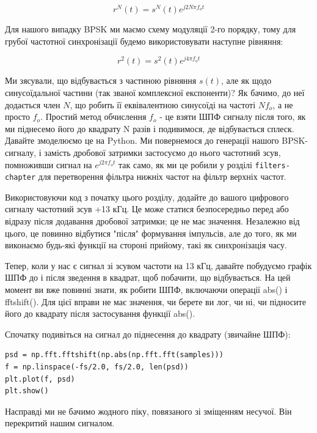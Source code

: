 \[r^N(t) = s^N(t) e^{j2N\pi f_o t}\]

Для нашого випадку BPSK ми маємо схему модуляції 2-го порядку, тому для
грубої частотної синхронізації будемо використовувати наступне рівняння:

\[r^2(t) = s^2(t) e^{j4\pi f_o t}\]

Ми з\textquotesingle ясували, що відбувається з частиною рівняння
\(s(t)\), але як щодо синусоїдальної частини (так званої комплексної
експоненти)? Як бачимо, до неї додається член \(N\), що робить її
еквівалентною синусоїді на частоті \(Nf_o\), а не просто \(f_o\).
Простий метод обчислення \(f_o\) - це взяти ШПФ сигналу після того, як
ми піднесемо його до квадрату N разів і подивимося, де відбувається
сплеск. Давайте змоделюємо це на Python. Ми повернемося до генерації
нашого BPSK-сигналу, і замість дробової затримки застосуємо до нього
частотний зсув, помноживши сигнал на \(e^{j2\pi f_o t}\) так само, як ми
це робили у розділі \texttt{filters-chapter} для перетворення фільтра
нижніх частот на фільтр верхніх частот.

Використовуючи код з початку цього розділу, додайте до вашого цифрового
сигналу частотний зсув +13 кГц. Це може статися безпосередньо перед або
відразу після додавання дробової затримки; це не має значення. Незалежно
від цього, це повинно відбутися "після" формування імпульсів, але до
того, як ми виконаємо будь-які функції на стороні прийому, такі як
синхронізація часу.

Тепер, коли у нас є сигнал зі зсувом частоти на 13 кГц, давайте
побудуємо графік ШПФ до і після зведення в квадрат, щоб побачити, що
відбувається. На цей момент ви вже повинні знати, як робити ШПФ,
включаючи операції abs() і fftshift(). Для цієї вправи не має значення,
чи берете ви лог, чи ні, чи підносите його до квадрату після
застосування функції abs().

Спочатку подивіться на сигнал до піднесення до квадрату (звичайне ШПФ):

\begin{Verbatim}[breaklines=true,breakanywhere=true,fontsize=\small]
psd = np.fft.fftshift(np.abs(np.fft.fft(samples)))
f = np.linspace(-fs/2.0, fs/2.0, len(psd))
plt.plot(f, psd)
plt.show()
\end{Verbatim}

\href{../_images/coarse-freq-sync-before.svg}{}

Насправді ми не бачимо жодного піку, пов\textquotesingle язаного зі
зміщенням несучої. Він перекритий нашим сигналом.


